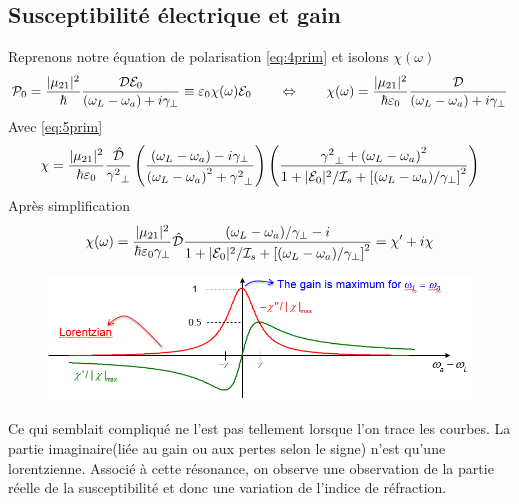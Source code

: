 \subsection{Susceptibilité électrique et gain}
Reprenons notre équation de polarisation \eqref{eq:4prim} et isolons $\chi(\omega)$
\begin{equation}
{{\cal P}_0} = \frac{{|{\mu _{21}}{|^2}}}{\hbar }\frac{{{\cal D}{{\cal E}_0}}}{{({\omega _L} - {\omega _a}) + i{\gamma _ \bot }}} \equiv {\varepsilon _0}\chi (\omega ){{\cal E}_0}\qquad\Leftrightarrow\qquad
\chi (\omega ) = \frac{{|{\mu _{21}}{|^2}}}{{\hbar {\varepsilon _0}}}\frac{{\cal D}}{{({\omega _L} - {\omega _a}) + i{\gamma _ \bot }}}
\end{equation}
Avec \eqref{eq:5prim}
\begin{equation}
\chi  = \frac{{|{\mu _{21}}{|^2}}}{{\hbar {\varepsilon _0}}}\frac{{{\hat {\cal D}}}}{{{\gamma ^2}_ \bot }}\left( {\frac{{({\omega _L} - {\omega _a}) - i{\gamma _ \bot }}}{{{{({\omega _L} - {\omega _a})}^2} + {\gamma ^2}_ \bot }}} \right)\left( {\frac{{{\gamma ^2}_ \bot  + {{({\omega _L} - {\omega _a})}^2}}}{{1 + |{{\cal E}_0}{|^2}/{{\cal I}_s} + {{[({\omega _L} - {\omega _a})/{\gamma _ \bot }]}^2}}}} \right)
\end{equation}
Après simplification
\begin{equation}
\chi (\omega ) = \frac{{|{\mu _{21}}{|^2}}}{{\hbar {\varepsilon _0}{\gamma _ \bot }}}\hat {\cal D}\frac{{({\omega _L} - {\omega _a})/{\gamma _ \bot } - i}}{{1 + |{{\cal E}_0}{|^2}/{{{\cal I}}_s} + {{[({\omega _L} - {\omega _a})/{\gamma _ \bot }]}^2}}} = \chi ' + i\chi 
\label{eq:ch3.6}
\end{equation}



	\begin{figure}
	\vspace{-5mm}
	\includegraphics[scale=0.5]{ch3/image10.png}
	\end{figure}
	Ce qui semblait compliqué ne l'est pas tellement lorsque l'on trace les courbes. La partie imaginaire(liée au gain ou aux pertes selon le signe) n'est qu'une lorentzienne. Associé à cette résonance, on observe une observation de la partie réelle de la susceptibilité et donc une variation de l'indice de réfraction.\\
	
